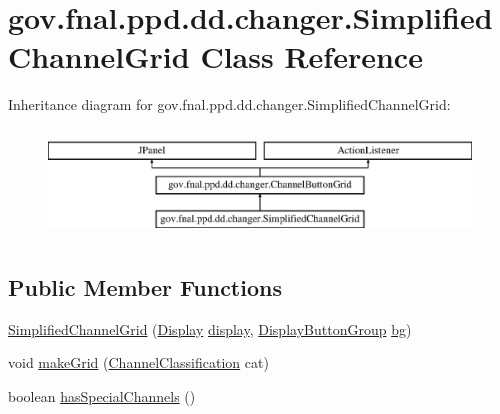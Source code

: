 \hypertarget{classgov_1_1fnal_1_1ppd_1_1dd_1_1changer_1_1SimplifiedChannelGrid}{\section{gov.\-fnal.\-ppd.\-dd.\-changer.\-Simplified\-Channel\-Grid Class Reference}
\label{classgov_1_1fnal_1_1ppd_1_1dd_1_1changer_1_1SimplifiedChannelGrid}
}
Inheritance diagram for gov.\-fnal.\-ppd.\-dd.\-changer.\-Simplified\-Channel\-Grid\-:\begin{figure}[H]
\begin{center}
\leavevmode
\includegraphics[height=2.906574cm]{classgov_1_1fnal_1_1ppd_1_1dd_1_1changer_1_1SimplifiedChannelGrid}
\end{center}
\end{figure}
\subsection*{Public Member Functions}
\begin{DoxyCompactItemize}
\item 
\hyperlink{classgov_1_1fnal_1_1ppd_1_1dd_1_1changer_1_1SimplifiedChannelGrid_a4406e3f9361d9f1650d55318db73f672}{Simplified\-Channel\-Grid} (\hyperlink{interfacegov_1_1fnal_1_1ppd_1_1dd_1_1signage_1_1Display}{Display} \hyperlink{classgov_1_1fnal_1_1ppd_1_1dd_1_1changer_1_1ChannelButtonGrid_a3c06b51489dcaacd16f6efcefe06bcaa}{display}, \hyperlink{classgov_1_1fnal_1_1ppd_1_1dd_1_1util_1_1specific_1_1DisplayButtonGroup}{Display\-Button\-Group} \hyperlink{classgov_1_1fnal_1_1ppd_1_1dd_1_1changer_1_1ChannelButtonGrid_adf258a89161282e5215b4642ecbec812}{bg})
\item 
void \hyperlink{classgov_1_1fnal_1_1ppd_1_1dd_1_1changer_1_1SimplifiedChannelGrid_aabe867c92d6955829fc0b2e0cf9192db}{make\-Grid} (\hyperlink{classgov_1_1fnal_1_1ppd_1_1dd_1_1changer_1_1ChannelClassification}{Channel\-Classification} cat)
\item 
boolean \hyperlink{classgov_1_1fnal_1_1ppd_1_1dd_1_1changer_1_1SimplifiedChannelGrid_a16bc62ae47eb1a4c6af07eeb9eac4eca}{has\-Special\-Channels} ()
\end{DoxyCompactItemize}
